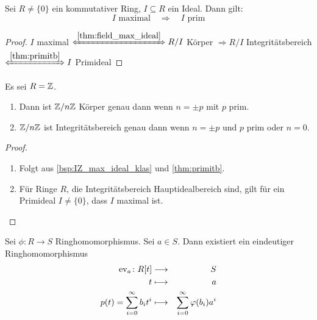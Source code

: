 \documentclass[12pt,a4paper]{scrartcl}
\begin{document}
\begin{kor} \label{cor:maxprim}
	Sei $R\neq\{0\}$ ein kommutativer Ring, $I\subseteq R$ ein Ideal. Dann gilt: \[\text{$I$ maximal} \quad  \Longrightarrow \quad  \text{$I $ prim} \]
\end{kor}
\begin{proof}
	$I$ maximal $\xLeftrightarrow{\ref{thm:field_max_ideal}}  R/I$ Körper $\Rightarrow R/I$ Integritätsbereich $\xLeftrightarrow{\ref{thm:primitb}} I$ Primideal
\end{proof}


\begin{kor} \label{cor:IZ_quotring_klas}
	Es sei $R=\mathbb Z$.
	\begin{enumerate}
	\item Dann ist $\mathbb Z/n\mathbb Z$ Körper genau dann wenn $n = \pm p$ mit $p$ prim.
	\item  $\mathbb Z/n\mathbb Z$ ist Integritätsbereich genau dann wenn $n = \pm p$ und $p$ prim oder $n = 0$.
	\end{enumerate}
\end{kor}

\begin{proof}
	\leavevmode
	\begin{enumerate}
		\item Folgt aus \cref{bsp:IZ_max_ideal_klas} und \cref{thm:primitb}.
		\item Für Ringe $R$, die Integritätsbereich Hauptidealbereich sind, gilt für ein Primideal $I \neq \{0\}$, dass $I $ maximal ist.
  \qedhere
  \end{enumerate}
\end{proof}	
	
\begin{satz}\label{thm:unieig_polyring}
	Sei $\phi\colon R\to S$ Ringhomomorphismus. Sei $a\in S$. Dann existiert ein eindeutiger Ringhomomorphismus
	\begin{eqnarray*}
		\operatorname{ev}_a\colon R[t] & \longrightarrow & S\\
		t & \longmapsto & a\\
		p(t )= \sum_{i = 0}^{\infty}b_it^i & \longmapsto& \sum_{i = 0}^{\infty} \varphi(b_i)a^i
	\end{eqnarray*}
	
\end{satz}
\end{document}
